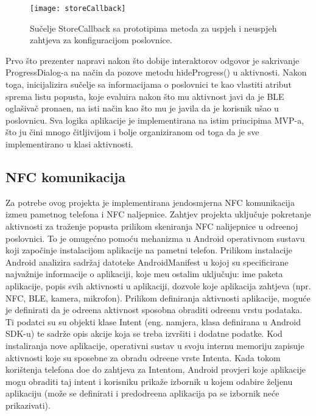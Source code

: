 \begin{figure}[!htbp]
	\begin{center}
 \texttt{[image: storeCallback]}
 \caption{Su\v{c}elje StoreCallback sa prototipima metoda za uspjeh i neuspjeh zahtjeva za konfiguracijom poslovnice.}
 \label{fig:storeCallback}
	\end{center}
\end{figure}

Prvo \v{s}to prezenter napravi nakon \v{s}to dobije interaktorov odgovor je sakrivanje ProgressDialog-a na na\v{c}in da pozove metodu hideProgress() u aktivnosti. Nakon toga, inicijalizira su\v{c}elje sa informacijama o poslovnici te kao vlastiti atribut sprema listu popusta, koje evaluira nakon \v{s}to mu aktivnost javi da je BLE ogla\v{s}iva\v{c} prona\dj en, na isti na\v{c}in kao \v{s}to mu je javila da je korisnik u\v{s}ao u poslovnicu. Sva logika aplikacije je implementirana na istim principima MVP-a, \v{s}to ju \v{c}ini mnogo \v{c}itljivijom i bolje organiziranom od toga da je sve implementirano u klasi aktivnosti.

\subsection{NFC komunikacija}

Za potrebe ovog projekta je implementirana jendosmjerna NFC komunikacija izme\dj u pametnog telefona i NFC naljepnice. Zahtjev projekta uklju\v{c}uje pokretanje aktivnosti za tra\v{z}enje popusta prilikom skeniranja NFC nalijepnice u odre\dj enoj poslovnici. To je omuge\'{c}no pomo\'{c}u mehanizma u Android operativnom sustavu koji zapo\v{c}inje instalacijom aplikacije na pametni telefon. Prilikom instalacije Android analizira sadr\v{z}aj datoteke AndroidManifest \cite{androidManifest} u kojoj su specificirane najva\v{z}nije informacije o aplikaciji, koje me\dj u ostalim uklju\v{c}uju: ime paketa aplikacije, popis svih aktivnosti u aplikaciji, dozvole koje aplikacija zahtjeva (npr. NFC, BLE, kamera, mikrofon). Prilikom definiranja aktivnosti aplikacije, mogu\'{c}e je definirati da je odre\dj ena aktivnost sposobna obraditi odre\dj enu vrstu podataka. Ti podatci su su objekti klase Intent (eng. namjera, klasa definirana u Android SDK-u) te sadr\v{z}e opis akcije koja se treba izvr\v{s}iti i dodatne podatke. Kod instaliranja nove aplikacije, operativni sustav u svoju internu memoriju zapisuje aktivnosti koje su sposebne za obradu odre\dj ene vrste Intenta. Kada tokom kori\v{s}tenja telefona do\dj e do zahtjeva za Intentom, Android provjeri koje aplikacije mogu obraditi taj intent i korisniku prika\v{z}e izbornik u kojem odabire \v{z}eljenu aplikaciju (mo\v{z}e se definirati i predodre\dj ena aplikacija pa se izbornik ne\'{c}e prikazivati).

